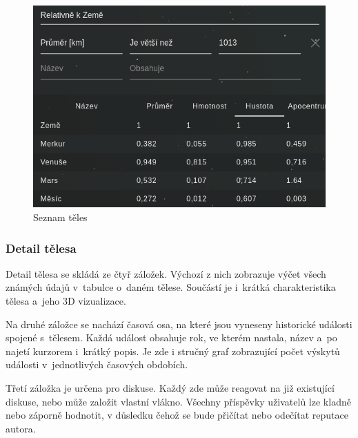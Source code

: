 \documentclass[a4paper,12pt]{article}
\begin{document}
\begin{figure}[H]
\begin{center}
\includegraphics[width=350pt]{Images/Bodies.png}
\caption{Seznam těles}
\label{BodiesList}
\end{center}
\end{figure}

\subsubsection{Detail tělesa}

Detail tělesa se skládá ze čtyř záložek. Výchozí z nich zobrazuje výčet všech známých údajů v~tabulce o~daném tělese. Součástí je i~krátká charakteristika tělesa a~jeho 3D vizualizace.

Na druhé záložce se nachází časová osa, na které jsou vyneseny historické události spojené s~tělesem. Každá událost obsahuje rok, ve kterém nastala, název a~po najetí kurzorem  i~krátký popis. Je zde i stručný graf zobrazující počet výskytů události v~jednotlivých časových obdobích.

Třetí záložka je určena pro diskuse. Každý zde může reagovat na již existující diskuse, nebo může založit vlastní vlákno. Všechny příspěvky uživatelů lze kladně nebo záporně hodnotit, v důsledku čehož se bude přičítat nebo odečítat reputace autora.
\end{document}
